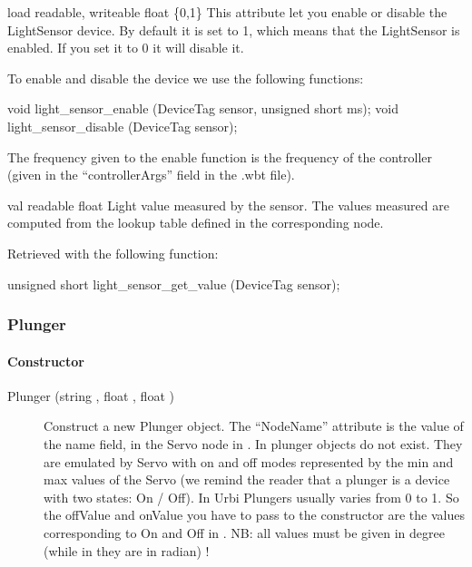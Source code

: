 \noindent
\begin{itemize}
\begin{attribute}{load}
  {readable, writeable}
  {float}
  {\{0,1\}}
  This attribute let you enable or disable the
  LightSensor device.  By default it is set to 1, which means that the
  LightSensor is enabled. If you set it to 0 it will disable it.

  To enable and disable the device we use the following \webots functions:

\begin{cxx}
void light_sensor_enable (DeviceTag sensor, unsigned short ms);
void light_sensor_disable (DeviceTag sensor);
\end{cxx}

The frequency given to the enable function is the frequency of the
\urbi controller (given in the ``controllerArgs'' field in the .wbt
file).
\end{attribute}

\begin{attribute}{val}
  {readable}
  {float}
  {}
  Light value measured by the sensor. The values measured
  are computed from the lookup table defined in the corresponding
  \webots node.

  Retrieved with the following \webots function:
\begin{cxx}
unsigned short light_sensor_get_value  (DeviceTag sensor);
\end{cxx}
\end{attribute}

\end{itemize}

\subsubsection{Plunger}

\paragraph{Constructor}

\noindent
\begin{description}
\item[{Plunger (string , float , float
    )}] Construct a new Plunger object. The ``NodeName''
  attribute is the value of the name field, in the Servo node in
  \webots. In \webots plunger objects do not exist. They are emulated by
  Servo with on and off modes represented by the min and max values of
  the Servo (we remind the reader that a plunger is a device with two
  states: On / Off). In Urbi Plungers usually varies from 0 to 1. So
  the offValue and onValue you have to pass to the constructor are the
  values corresponding to On and Off in \webots. NB: all values must be
  given in degree (while in \webots they are in radian) !
\end{description}

